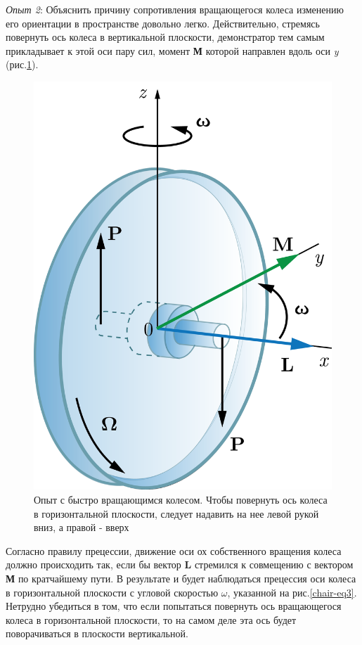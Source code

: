 \documentclass[14pt,a4paper,oneside]{extarticle}	%
\begin{document}
\textit{Опыт 2}:
Объяснить причину сопротивления вращающегося колеса изменению его ориентации в пространстве довольно легко.
Действительно, стремясь повернуть ось колеса в вертикальной плоскости, демонстратор тем самым прикладывает к этой оси пару сил, момент \textbf{М} которой направлен вдоль оси \textit{y} (рис.\ref{chair-3}).
	\begin{figure}[H] 	
	\centering 	
	\includegraphics[width=0.45\linewidth]{chair-3.png}
	\caption{Опыт с быстро вращающимся колесом. Чтобы повернуть ось колеса в горизонтальной плоскости, следует надавить на нее левой рукой вниз, а правой - вверх}
	\label{chair-3}
\end{figure}

Согласно правилу прецессии, движение оси ох собственного вращения колеса должно происходить так, если бы вектор \textbf{L} стремился к совмещению с вектором \textbf{М} по кратчайшему пути.
В результате и будет наблюдаться прецессия оси колеса в горизонтальной плоскости с угловой скоростью $ \omega $, указанной на рис.\ref{chair-eq3}.
Нетрудно убедиться в том, что если попытаться повернуть ось вращающегося колеса в горизонтальной плоскости, то на самом деле эта ось будет поворачиваться в плоскости вертикальной.
\newpage
\end{document}
